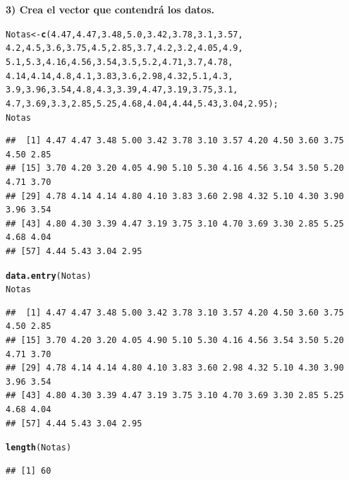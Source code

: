 \documentclass[12pt,letterpaper]{article}\usepackage[]{graphicx}\usepackage[]{color}
\makeatletter
\newcommand{\hlnum}[1]{\textcolor[rgb]{0.686,0.059,0.569}{#1}}%
\newcommand{\hlstd}[1]{\textcolor[rgb]{0.345,0.345,0.345}{#1}}%
\newcommand{\hlkwb}[1]{\textcolor[rgb]{0.69,0.353,0.396}{#1}}%
\newcommand{\hlkwd}[1]{\textcolor[rgb]{0.737,0.353,0.396}{\textbf{#1}}}%
\newenvironment{kframe}{%
 \def\at@end@of@kframe{}%
 \ifinner\ifhmode%
  \def\at@end@of@kframe{\end{minipage}}%
  \begin{minipage}{\columnwidth}%
 \fi\fi%
 \def\FrameCommand##1{\hskip\@totalleftmargin \hskip-\fboxsep
 \colorbox{shadecolor}{##1}\hskip-\fboxsep
     \hskip-\linewidth \hskip-\@totalleftmargin \hskip\columnwidth}%
 \MakeFramed {\advance\hsize-\width
   \@totalleftmargin\z@ \linewidth\hsize
   \@setminipage}}%
 {\par\unskip\endMakeFramed%
 \at@end@of@kframe}
\newenvironment{knitrout}{}{} %
\makeatother
\begin{document}
\textbf{3) Crea el vector que contendr\'a los datos.}
\begin{knitrout}
\color{fgcolor}\begin{kframe}
\begin{alltt}
\hlstd{Notas} \hlkwb{<-} \hlkwd{c}\hlstd{(}\hlnum{4.47}\hlstd{,} \hlnum{4.47}\hlstd{,}\hlnum{3.48}\hlstd{,} \hlnum{5.0}\hlstd{,} \hlnum{3.42}\hlstd{,} \hlnum{3.78}\hlstd{,} \hlnum{3.1}\hlstd{,} \hlnum{3.57}\hlstd{,}
\hlnum{4.2}\hlstd{,} \hlnum{4.5}\hlstd{,} \hlnum{3.6}\hlstd{,} \hlnum{3.75}\hlstd{,} \hlnum{4.5}\hlstd{,} \hlnum{2.85}\hlstd{,} \hlnum{3.7}\hlstd{,} \hlnum{4.2}\hlstd{,} \hlnum{3.2}\hlstd{,} \hlnum{4.05}\hlstd{,} \hlnum{4.9}\hlstd{,}
\hlnum{5.1}\hlstd{,} \hlnum{5.3}\hlstd{,} \hlnum{4.16}\hlstd{,} \hlnum{4.56}\hlstd{,} \hlnum{3.54}\hlstd{,} \hlnum{3.5}\hlstd{,} \hlnum{5.2}\hlstd{,} \hlnum{4.71}\hlstd{,} \hlnum{3.7}\hlstd{,} \hlnum{4.78}\hlstd{,}
\hlnum{4.14}\hlstd{,} \hlnum{4.14}\hlstd{,} \hlnum{4.8}\hlstd{,} \hlnum{4.1}\hlstd{,} \hlnum{3.83}\hlstd{,} \hlnum{3.6}\hlstd{,} \hlnum{2.98}\hlstd{,} \hlnum{4.32}\hlstd{,} \hlnum{5.1}\hlstd{,} \hlnum{4.3}\hlstd{,}
\hlnum{3.9}\hlstd{,} \hlnum{3.96}\hlstd{,} \hlnum{3.54}\hlstd{,} \hlnum{4.8}\hlstd{,} \hlnum{4.3}\hlstd{,} \hlnum{3.39}\hlstd{,} \hlnum{4.47}\hlstd{,}\hlnum{3.19}\hlstd{,} \hlnum{3.75}\hlstd{,} \hlnum{3.1}\hlstd{,}
\hlnum{4.7}\hlstd{,} \hlnum{3.69}\hlstd{,} \hlnum{3.3}\hlstd{,} \hlnum{2.85}\hlstd{,} \hlnum{5.25}\hlstd{,} \hlnum{4.68}\hlstd{,} \hlnum{4.04}\hlstd{,} \hlnum{4.44}\hlstd{,} \hlnum{5.43}\hlstd{,} \hlnum{3.04}\hlstd{,} \hlnum{2.95}\hlstd{);}
\hlstd{Notas}
\end{alltt}
\begin{verbatim}
##  [1] 4.47 4.47 3.48 5.00 3.42 3.78 3.10 3.57 4.20 4.50 3.60 3.75 4.50 2.85
## [15] 3.70 4.20 3.20 4.05 4.90 5.10 5.30 4.16 4.56 3.54 3.50 5.20 4.71 3.70
## [29] 4.78 4.14 4.14 4.80 4.10 3.83 3.60 2.98 4.32 5.10 4.30 3.90 3.96 3.54
## [43] 4.80 4.30 3.39 4.47 3.19 3.75 3.10 4.70 3.69 3.30 2.85 5.25 4.68 4.04
## [57] 4.44 5.43 3.04 2.95
\end{verbatim}
\begin{alltt}
\hlkwd{data.entry}\hlstd{(Notas)}
\hlstd{Notas}
\end{alltt}
\begin{verbatim}
##  [1] 4.47 4.47 3.48 5.00 3.42 3.78 3.10 3.57 4.20 4.50 3.60 3.75 4.50 2.85
## [15] 3.70 4.20 3.20 4.05 4.90 5.10 5.30 4.16 4.56 3.54 3.50 5.20 4.71 3.70
## [29] 4.78 4.14 4.14 4.80 4.10 3.83 3.60 2.98 4.32 5.10 4.30 3.90 3.96 3.54
## [43] 4.80 4.30 3.39 4.47 3.19 3.75 3.10 4.70 3.69 3.30 2.85 5.25 4.68 4.04
## [57] 4.44 5.43 3.04 2.95
\end{verbatim}
\begin{alltt}
\hlkwd{length}\hlstd{(Notas)}
\end{alltt}
\begin{verbatim}
## [1] 60
\end{verbatim}
\end{kframe}
\end{knitrout}
\end{document}
